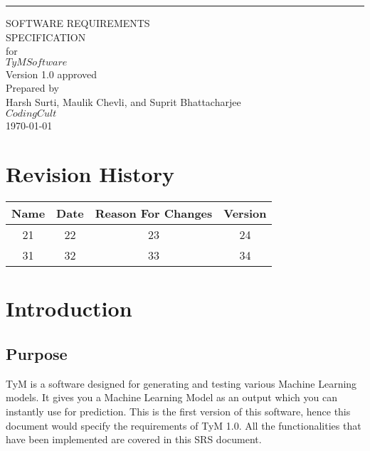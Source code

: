 \documentclass{scrreprt}
\date{}
\def\myversion{1.0 }
\begin{document}
\begin{flushright}
    \rule{16cm}{5pt}\vskip1cm
    \begin{bfseries}
        \Huge{SOFTWARE REQUIREMENTS\\ SPECIFICATION}\\
        \vspace{1.9cm}
        for\\
        \vspace{1.9cm}
        $TyM Software$\\
        \vspace{1.9cm}
        \LARGE{Version \myversion approved}\\
        \vspace{1.9cm}
        Prepared by \\ Harsh Surti, Maulik Chevli, and Suprit Bhattacharjee\\
        \vspace{1.9cm}
        $Coding Cult$\\
        \vspace{1.9cm}
        \today\\
    \end{bfseries}
\end{flushright}

\tableofcontents


\chapter*{Revision History}

\begin{center}
    \begin{tabular}{|c|c|c|c|}
        \hline
	    Name & Date & Reason For Changes & Version\\
        \hline
	    21 & 22 & 23 & 24\\
        \hline
	    31 & 32 & 33 & 34\\
        \hline
    \end{tabular}
\end{center}

\chapter{Introduction}

\section{Purpose}
TyM is a software designed for generating and testing various Machine Learning models. It gives you a Machine Learning Model as an output which you can instantly use for prediction. This is the first version of this software, hence this document would specify the requirements of TyM 1.0. All the functionalities that have been implemented are covered in this SRS document.
\end{document}
